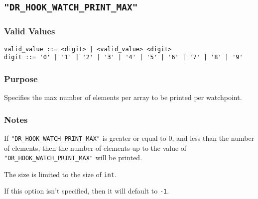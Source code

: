 
\subsection{\texttt{"DR\_HOOK\_WATCH\_PRINT\_MAX"}}
\label{section:flags:DR_HOOK_WATCH_PRINT_MAX}
\vspace{-2ex}
\subsubsection{Valid Values}
\vspace{-2ex}
\verb+valid_value ::= <digit> | <valid_value> <digit> + \\
\verb+digit ::= '0' | '1' | '2' | '3' | '4' | '5' | '6' | '7' | '8' | '9'+

\vspace{-2ex}
\subsubsection{Purpose}
\vspace{-2ex}
Specifies the max number of elements per array to be printed per watchpoint.

\vspace{-2ex}
\subsubsection{Notes}
\vspace{-2ex}
If \texttt{"DR\_HOOK\_WATCH\_PRINT\_MAX"} is greater or equal to 0, and less than the number of elements, then the number of elements up to the value of \texttt{"DR\_HOOK\_WATCH\_PRINT\_MAX"} will be printed.

The size is limited to the size of \verb|int|.

If this option isn't specified, then it will default to \verb|-1|.






